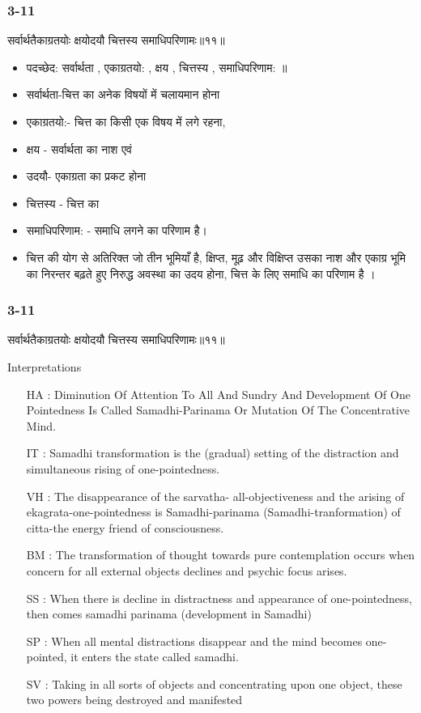 \begin{frame}[fragile]\frametitle{3-11}
\begin{sanskrit}
सर्वार्थतैकाग्रतयोः क्षयोदयौ चित्तस्य समाधिपरिणामः॥११॥
\end{sanskrit}

	\begin{itemize}
	\item पदच्छेद:  सर्वार्थता , एकाग्रतयो: , क्षय‌ , चित्तस्य , समाधिपरिणाम: ॥
	\item सर्वार्थता-चित्त का अनेक विषयों में चलायमान होना
	\item एकाग्रतयो:- चित्त का किसी एक विषय में लगे रहना,
	\item क्षय - सर्वार्थता का नाश एवं
	\item उदयौ- एकाग्रता का प्रकट होना
	\item चित्तस्य - चित्त का
	\item समाधिपरिणाम: - समाधि लगने का परिणाम है।
	\item चित्त की योग से अतिरिक्त जो तीन भूमियाँ है, क्षिप्त, मूढ़ और विक्षिप्त उसका नाश और एकाग्र भूमि का निरन्तर बढ़ते हुए निरुद्ध अवस्था का उदय होना, चित्त के लिए समाधि का परिणाम है ।
	\end{itemize}
\end{frame}

\begin{frame}[fragile]\frametitle{3-11}
\begin{sanskrit}
सर्वार्थतैकाग्रतयोः क्षयोदयौ चित्तस्य समाधिपरिणामः॥११॥
\end{sanskrit}

Interpretations
\begin{itemize}	
\item [HA]: Diminution Of Attention To All And Sundry And Development Of One Pointedness Is Called Samadhi-Parinama Or Mutation Of The Concentrative Mind.
\item [IT]: Samadhi transformation is the (gradual) setting of the distraction and simultaneous rising of one-pointedness.
\item [VH]: The disappearance of the sarvatha- all-objectiveness and the arising of ekagrata-one-pointedness is Samadhi-parinama (Samadhi-tranformation) of citta-the energy friend of consciousness.
\item [BM]: The transformation of thought towards pure contemplation occurs when concern for all external objects declines and psychic focus arises.
\item [SS]: When there is decline in distractness and appearance of one-pointedness, then comes samadhi parinama (development in Samadhi)
\item [SP]: When all mental distractions disappear and the mind becomes one-pointed, it enters the state called samadhi.
\item [SV]: Taking in all sorts of objects and concentrating upon one object, these two powers being destroyed and manifested 
\end{itemize}
\end{frame}


